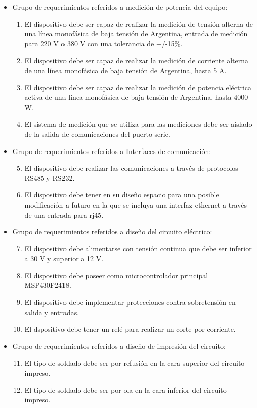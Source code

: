 \begin{itemize}
\item Grupo de requerimientos referidos a medición de potencia del equipo:
\begin{enumerate}
\item El dispositivo debe ser capaz de realizar la medición de tensión alterna de una línea monofásica de baja tensión de Argentina, entrada de medición para 220 V o 380 V con una tolerancia de +/-15\%.
\item El dispositivo debe ser capaz de realizar la medición de corriente alterna de una línea monofásica de baja tensión de Argentina, hasta 5 A.
\item El dispositivo debe ser capaz de realizar la medición de potencia eléctrica activa de una línea monofásica de baja tensión de Argentina, hasta 4000 W.
\item El sistema de medición que se utiliza para las mediciones debe ser aislado de la salida de comunicaciones del puerto serie.
\end{enumerate}

\item Grupo de requerimientos referidos a Interfaces de comunicación:
\begin{enumerate}
\setcounter{enumi}{4}
\item El dispositivo debe realizar las comunicaciones a través de protocolos RS485 y RS232.
\item El dispositivo debe tener en su diseño espacio para una posible modificación a futuro en la que se incluya una interfaz ethernet a través de una entrada para rj45.
\end{enumerate}

\item Grupo de requerimientos referidos a diseño del circuito eléctrico:
\begin{enumerate}
\setcounter{enumi}{6}
\item El dispositivo debe alimentarse con tensión continua que debe ser inferior a 30 V y superior a 12 V.
\item El dispositivo debe poseer como microcontrolador principal MSP430F2418.
\item El dispositivo debe implementar protecciones contra sobretensión en salida y entradas.
\item El dspositivo debe tener un relé para realizar un corte por corriente.
\end{enumerate}

\item Grupo de requerimientos referidos a diseño  de impresión del circuito:
\begin{enumerate}
\setcounter{enumi}{10}
\item El tipo de soldado debe ser por refusión en la cara superior del circuito impreso.

\item El tipo de soldado debe ser por ola en la cara inferior del circuito impreso.
\end{enumerate}
\end{itemize}


